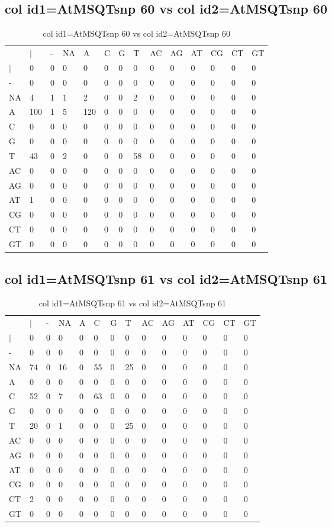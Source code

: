 \subsection{col id1=AtMSQTsnp 60 vs col id2=AtMSQTsnp 60}
\begin{center}
\begin{longtable}{|l|l|l|l|l|l|l|l|l|l|l|l|l|l|}
\caption{col id1=AtMSQTsnp 60 vs col id2=AtMSQTsnp 60} \label{table_dm944}\\
\hline
\\
\hline
&$|$&-&NA&A&C&G&T&AC&AG&AT&CG&CT&GT\\
$|$&0&0&0&0&0&0&0&0&0&0&0&0&0\\
-&0&0&0&0&0&0&0&0&0&0&0&0&0\\
NA&4&1&1&2&0&0&2&0&0&0&0&0&0\\
A&100&1&5&120&0&0&0&0&0&0&0&0&0\\
C&0&0&0&0&0&0&0&0&0&0&0&0&0\\
G&0&0&0&0&0&0&0&0&0&0&0&0&0\\
T&43&0&2&0&0&0&58&0&0&0&0&0&0\\
AC&0&0&0&0&0&0&0&0&0&0&0&0&0\\
AG&0&0&0&0&0&0&0&0&0&0&0&0&0\\
AT&1&0&0&0&0&0&0&0&0&0&0&0&0\\
CG&0&0&0&0&0&0&0&0&0&0&0&0&0\\
CT&0&0&0&0&0&0&0&0&0&0&0&0&0\\
GT&0&0&0&0&0&0&0&0&0&0&0&0&0\\
\hline
\end{longtable}
\end{center}

\subsection{col id1=AtMSQTsnp 61 vs col id2=AtMSQTsnp 61}
\begin{center}
\begin{longtable}{|l|l|l|l|l|l|l|l|l|l|l|l|l|l|}
\caption{col id1=AtMSQTsnp 61 vs col id2=AtMSQTsnp 61} \label{table_dm946}\\
\hline
\\
\hline
&$|$&-&NA&A&C&G&T&AC&AG&AT&CG&CT&GT\\
$|$&0&0&0&0&0&0&0&0&0&0&0&0&0\\
-&0&0&0&0&0&0&0&0&0&0&0&0&0\\
NA&74&0&16&0&55&0&25&0&0&0&0&0&0\\
A&0&0&0&0&0&0&0&0&0&0&0&0&0\\
C&52&0&7&0&63&0&0&0&0&0&0&0&0\\
G&0&0&0&0&0&0&0&0&0&0&0&0&0\\
T&20&0&1&0&0&0&25&0&0&0&0&0&0\\
AC&0&0&0&0&0&0&0&0&0&0&0&0&0\\
AG&0&0&0&0&0&0&0&0&0&0&0&0&0\\
AT&0&0&0&0&0&0&0&0&0&0&0&0&0\\
CG&0&0&0&0&0&0&0&0&0&0&0&0&0\\
CT&2&0&0&0&0&0&0&0&0&0&0&0&0\\
GT&0&0&0&0&0&0&0&0&0&0&0&0&0\\
\hline
\end{longtable}
\end{center}

